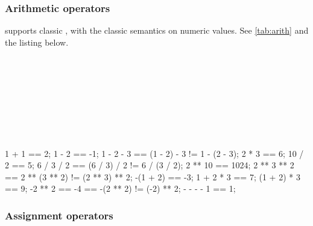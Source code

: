 \newenvironment{operatorTable}[3][]
{
  \def\operatorTableLabel{#2}%
  \def\operatorTableCaption{#3}%
  \begin{table}[\floatposh]
    \centering#1%
    \begin{operatorTabular}
    }{%
    \end{operatorTabular}
    \caption{\operatorTableCaption}
    \label{\operatorTableLabel}
  \end{table}
}

\subsubsection{Arithmetic operators}
\label{sec:lang:op:arith}


\us supports classic , with the classic semantics
on numeric values. See \autoref{tab:arith} and the listing below.
\begin{operatorTable}{tab:arith}{Arithmetic operators}
  \operatorexp
  \\\hline
  \operatoruplus\\\operatorumin
  \\\hline
  \operatormult\\\operatordiv\\\operatormod
  \\\hline
  \operatorplus\\\operatorminus
\end{operatorTable}

\begin{urbiassert}
       1 + 1 ==    2;
       1 - 2 ==   -1;  1 - 2 - 3 == (1 - 2) - 3 != 1 - (2 - 3);
       2 * 3 ==    6;
      10 / 2 ==    5;  6 / 3 / 2 == (6 / 3) / 2 != 6 / (3 / 2);
     2 ** 10 == 1024;  2 ** 3 ** 2 == 2 ** (3 ** 2) != (2 ** 3) ** 2;
    -(1 + 2) ==   -3;
   1 + 2 * 3 ==    7;
 (1 + 2) * 3 ==    9;
     -2 ** 2 ==   -4 == -(2 ** 2) != (-2) ** 2;
   - - - - 1 ==    1;
\end{urbiassert}

\subsubsection{Assignment operators}
\label{sec:lang:op:ass}

